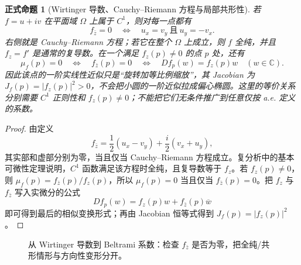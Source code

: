 \documentclass[UTF8,fontset=none,a4paper,11pt]{ctexart}
\theoremstyle{foundation-definition}
\theoremstyle{foundation-theorem}
\theoremstyle{foundation-proposition}
\newtheorem{proposition}[definition]{正式命题}
\theoremstyle{foundation-example}
\theoremstyle{foundation-remark}
\theoremstyle{foundation-theorem}
\begin{document}
\begin{proposition}[Wirtinger 导数、Cauchy--Riemann 方程与局部共形性]\label{prop:wirtinger-cr-conformal}
若 \(f=u+iv\) 在平面域 \(\Omega\) 上属于 \(C^1\)，则对每一点都有
\[
f_{\bar z}=0
\quad\Longleftrightarrow\quad
u_x=v_y\ \text{且}\ u_y=-v_x.
\]
右侧就是 Cauchy--Riemann 方程；若它在整个 \(\Omega\) 上成立，则 \(f\) 全纯，并且
\(f_z=f'\) 是通常的复导数。在一个满足 \(f_z(p)\neq0\) 的点 \(p\) 处，还有
\[
\mu_f(p)=0
\quad\Longleftrightarrow\quad f_{\bar z}(p)=0
\quad\Longleftrightarrow\quad
D f_p(w)=f_z(p)w\quad(w\in\mathbb C).
\]
因此该点的一阶实线性近似只是“旋转加等比例缩放”，其 Jacobian 为
\(J_f(p)=|f_z(p)|^2>0\)，不会把小圆的一阶近似拉成偏心椭圆。这里的等价关系分别需要
\(C^1\) 正则性和 \(f_z(p)\neq0\)；不能把它们无条件推广到任意仅按 a.e. 定义的系数。
\end{proposition}

\begin{proof}
由定义
\[
f_{\bar z}=\frac12(u_x-v_y)+\frac{i}{2}(v_x+u_y),
\]
其实部和虚部分别为零，当且仅当 Cauchy--Riemann 方程成立。复分析中的基本可微性定理说明，\(C^1\) 函数满足该方程时全纯，且复导数等于 \(f_z\)。若 \(f_z(p)\neq0\)，则
\(\mu_f(p)=f_{\bar z}(p)/f_z(p)\)，所以 \(\mu_f(p)=0\) 当且仅当 \(f_{\bar z}(p)=0\)。把 \(f_z\) 与 \(f_{\bar z}\) 写入实微分的公式
\[
D f_p(w)=f_z(p)w+f_{\bar z}(p)\overline w
\]
即可得到最后的相似变换形式；再由 Jacobian 恒等式得到 \(J_f(p)=|f_z(p)|^2\)。
\end{proof}

\begin{figure}[htbp]
\centering
{}
\caption{从 Wirtinger 导数到 Beltrami 系数：检查 \(f_{\bar z}\) 是否为零，把全纯/共形情形与方向性变形分开。}
\label{fig:wirtinger-to-beltrami}
\end{figure}
\end{document}
